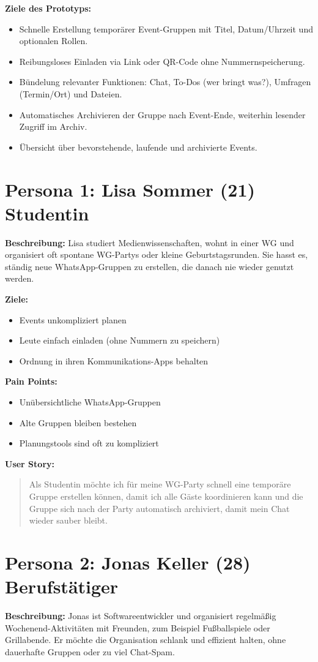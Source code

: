 \documentclass[11pt,a4paper]{article}
\begin{document}
\textbf{Ziele des Prototyps:}
\begin{itemize}
  \item Schnelle Erstellung temporärer Event-Gruppen mit Titel, Datum/Uhrzeit und optionalen Rollen.
  \item Reibungsloses Einladen via Link oder QR-Code ohne Nummernspeicherung.
  \item Bündelung relevanter Funktionen: Chat, To-Dos (wer bringt was?), Umfragen (Termin/Ort) und Dateien.
  \item Automatisches Archivieren der Gruppe nach Event-Ende, weiterhin lesender Zugriff im Archiv.
  \item Übersicht über bevorstehende, laufende und archivierte Events.
\end{itemize}

\section*{Persona 1: Lisa Sommer (21) Studentin}
\textbf{Beschreibung:} Lisa studiert Medienwissenschaften, wohnt in einer WG und organisiert oft spontane WG-Partys oder kleine Geburtstagsrunden. Sie hasst es, ständig neue WhatsApp-Gruppen zu erstellen, die danach nie wieder genutzt werden.

\textbf{Ziele:}
\begin{itemize}
  \item Events unkompliziert planen
  \item Leute einfach einladen (ohne Nummern zu speichern)
  \item Ordnung in ihren Kommunikations-Apps behalten
\end{itemize}

\textbf{Pain Points:}
\begin{itemize}
  \item Unübersichtliche WhatsApp-Gruppen
  \item Alte Gruppen bleiben bestehen
  \item Planungstools sind oft zu kompliziert
\end{itemize}

\textbf{User Story:}
\begin{quote}
Als Studentin möchte ich für meine WG-Party schnell eine temporäre Gruppe erstellen können, damit ich alle Gäste koordinieren kann und die Gruppe sich nach der Party automatisch archiviert, damit mein Chat wieder sauber bleibt.
\end{quote}

\section*{Persona 2: Jonas Keller (28) Berufstätiger}
\textbf{Beschreibung:} Jonas ist Softwareentwickler und organisiert regelmäßig Wochenend-Aktivitäten mit Freunden, zum Beispiel Fußballspiele oder Grillabende. Er möchte die Organisation schlank und effizient halten, ohne dauerhafte Gruppen oder zu viel Chat-Spam.
\end{document}
